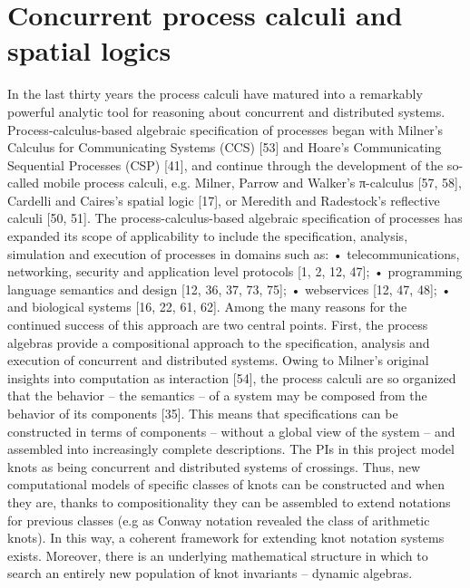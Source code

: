 \documentclass[12pt]{amsart}
\begin{document}
\section{Concurrent process calculi and spatial logics }\label{sec:concurrent_process_calculi_and_spatial_logics_} %
In the last thirty years the process calculi have matured into a remarkably powerful analytic tool for reasoning about concurrent and distributed systems. Process-calculus-based algebraic specification of processes began with Milner's Calculus for Communicating Systems (CCS) [53] and Hoare's Communicating Sequential Processes (CSP) [41], and continue through the development of the so-called mobile process calculi, e.g. Milner, Parrow and Walker's π-calculus [57, 58], Cardelli and Caires's spatial logic [17], or Meredith and Radestock's reflective calculi [50, 51]. The process-calculus-based algebraic specification of processes has expanded its scope of applicability to include the specification, analysis, simulation and execution of processes in domains such as:
• telecommunications, networking, security and application level protocols [1, 2, 12, 47];
• programming language semantics and design [12, 36, 37, 73, 75];
• webservices [12, 47, 48];
• and biological systems [16, 22, 61, 62].
Among the many reasons for the continued success of this approach are two central points. First, the process algebras provide a compositional approach to the specification, analysis and execution of concurrent and distributed systems. Owing to Milner's original insights into computation as interaction [54], the process calculi are so organized that the behavior – the semantics – of a system may be composed from the behavior of its components [35]. This means that specifications can be constructed in terms of components – without a global view of the system – and assembled into increasingly complete descriptions. The PIs in this project model knots as being concurrent and distributed systems of crossings. Thus, new computational models of specific classes of knots can be constructed and when they are, thanks to compositionality they can be assembled to extend notations for previous classes (e.g as Conway notation revealed the class of arithmetic knots). In this way, a coherent framework for extending knot notation systems exists. Moreover, there is an underlying mathematical structure in which to search an entirely new population of knot invariants – dynamic algebras.
\end{document}
